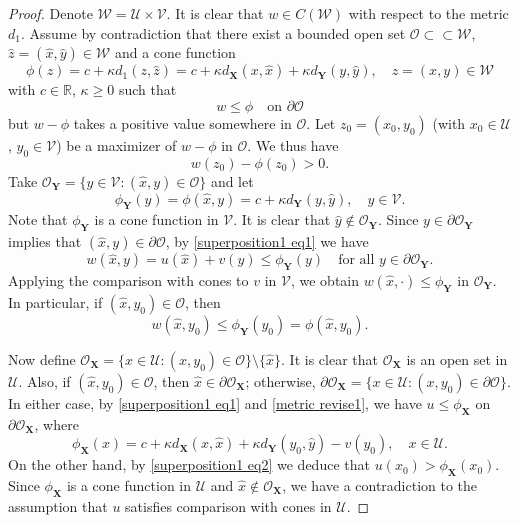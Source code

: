 \documentclass[12pt, reqno]{amsart}
\newcommand{\R}{\mathbb{R}}
\def\R{{\mathbb R}}
\def\X{{\mathbf X}}
\def\Y{{\mathbf Y}}
\def\O{{\mathcal O}}
\def\U{{\mathcal U}}
\def\V{{\mathcal V}}
\def\W{{\mathcal W}}
\begin{document}
\begin{proof}
Denote $\W=\U\times \V$. It is clear that $w\in C(\W)$ with respect to the metric $d_1$. Assume by contradiction that there exist a bounded open set $\O\subset\subset \W$, $\hat{z}=(\hat{x}, \hat{y})\in \W$ and a cone function 
\[
\phi(z)=c+\kappa d_{1}(z, \hat{z})=c+\kappa d_\X(x, \hat{x})+\kappa d_\Y(y, \hat{y}), \quad z=(x, y)\in \W
\]
with $c\in \R$, $\kappa\geq 0$ such that 
\begin{equation}\label{superposition1 eq1}
w\leq \phi\quad \text{on $\partial \O$}
\end{equation}
but $w-\phi$ takes a positive value somewhere in $\O$. Let $z_0=(x_0, y_0)$ (with $x_0\in \U$, $y_0\in \V$) be a maximizer of $w-\phi$ in $\O$. We thus have 
\begin{equation}\label{superposition1 eq2}
w(z_0)-\phi(z_0)>0.
\end{equation}
Take $\O_{\Y}=\{y\in \V: (\hat{x}, y)\in \O\}$ and let
\[
\phi_\Y(y)=\phi(\hat{x}, y)= c+\kappa d_\Y(y, \hat{y}), \quad y\in \V. 
\]
Note that $\phi_\Y$ is a cone function in $\V$. 
It is clear that $\hat{y}\notin \O_\Y$. Since $y\in \partial \O_\Y$ implies that $(\hat{x}, y)\in \partial \O$, by \eqref{superposition1 eq1} we have 
\[
w(\hat{x}, y)=u(\hat{x})+v(y)\leq \phi_\Y(y) \quad \text{for all $y\in \partial \O_\Y$}. 
\]
Applying the comparison with cones to $v$ in $\V$, we obtain $w(\hat{x}, \cdot)\leq \phi_\Y$ in $\O_\Y$. In particular, if $(\hat{x}, y_0)\in \O$, then 
\begin{equation}\label{metric revise1}
w(\hat{x}, y_0)\leq \phi_\Y(y_0)=\phi(\hat{x}, y_0).    
\end{equation}


Now define $\O_{\X}=\{x\in \U: (x,y_0)\in \O\}\setminus \{\hat{x}\}$. It is clear that $\O_\X$ is an open set in $\U$. Also, if $(\hat{x}, y_0)\in \O$, then $\hat{x}\in \partial \O_\X$; otherwise, $\partial \O_\X=\{x\in \U: (x, y_0)\in \partial \O\}$. In either case, by \eqref{superposition1 eq1} and \eqref{metric revise1}, we have
 $u\leq \phi_{\X}$ on $\partial \O_{\X}$, where
\[
\phi_{\X}(x)=c+\kappa d_\X(x, \hat{x})+\kappa d_\Y(y_0, \hat{y})-v(y_0), \quad x\in \U. 
\]
On the other hand, by \eqref{superposition1 eq2} we deduce that $u(x_0)>\phi_\X(x_0)$. Since $\phi_{\X}$ is a cone function in $\U$ and $\hat{x}\notin \O_{\X}$, we have a contradiction to the assumption that $u$ satisfies comparison with cones in $\U$. 
\end{proof}
\end{document}
